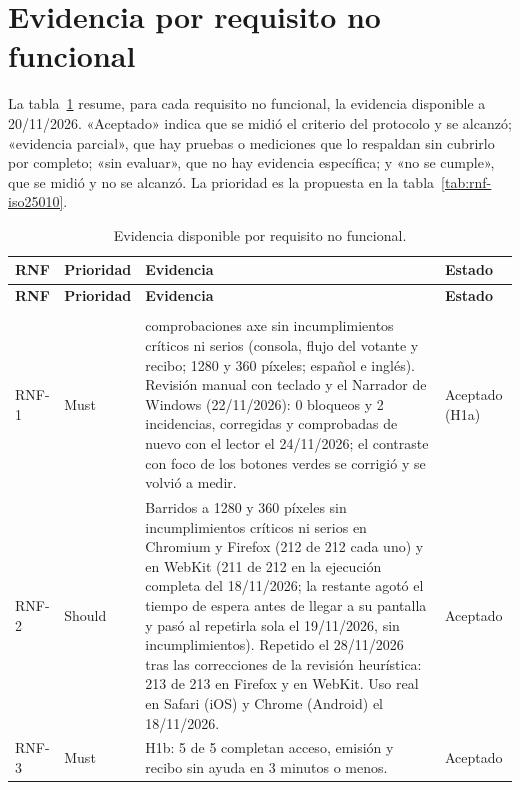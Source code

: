 \section{Evidencia por requisito no funcional}
\label{sec:evidencia-rnf}
La tabla~\ref{tab:evidencia-rnf} resume, para cada requisito no funcional, la
evidencia disponible a 20/11/2026. «Aceptado» indica que se midió el criterio
del protocolo y se alcanzó; «evidencia parcial», que hay pruebas o mediciones
que lo respaldan sin cubrirlo por completo; «sin evaluar», que no hay evidencia
específica; y «no se cumple», que se midió y no se alcanzó. La prioridad es la
propuesta en la tabla~\ref{tab:rnf-iso25010}.

\small
\begin{longtable}{|>{\raggedright\arraybackslash}p{}|>{\raggedright\arraybackslash}p{}|>{\raggedright\arraybackslash}p{}|>{\raggedright\arraybackslash}p{}|}
\caption{Evidencia disponible por requisito no funcional.}\label{tab:evidencia-rnf}\\
\hline
\textbf{RNF} & \textbf{Prioridad} & \textbf{Evidencia} & \textbf{Estado} \\
\hline
\endfirsthead
\hline
\textbf{RNF} & \textbf{Prioridad} & \textbf{Evidencia} & \textbf{Estado} \\
\hline
\endhead
\hline
\multicolumn{4}{r}{Continúa en la página siguiente.}\\
\endfoot
\hline
\endlastfoot
RNF-1 & Must & 212 comprobaciones axe sin incumplimientos críticos ni serios (consola, flujo del votante y recibo; 1280 y 360 píxeles; español e inglés). Revisión manual con teclado y el Narrador de Windows (22/11/2026): 0 bloqueos y 2 incidencias, corregidas y comprobadas de nuevo con el lector el 24/11/2026; el contraste con foco de los botones verdes se corrigió y se volvió a medir. & Aceptado (H1a) \\
\hline
RNF-2 & Should & Barridos a 1280 y 360 píxeles sin incumplimientos críticos ni serios en Chromium y Firefox (212 de 212 cada uno) y en WebKit (211 de 212 en la ejecución completa del 18/11/2026; la restante agotó el tiempo de espera antes de llegar a su pantalla y pasó al repetirla sola el 19/11/2026, sin incumplimientos). Repetido el 28/11/2026 tras las correcciones de la revisión heurística: 213 de 213 en Firefox y en WebKit. Uso real en Safari (iOS) y Chrome (Android) el 18/11/2026. & Aceptado \\
\hline
RNF-3 & Must & H1b: 5 de 5 completan acceso, emisión y recibo sin ayuda en 3 minutos o menos. & Aceptado \\

\end{longtable}
